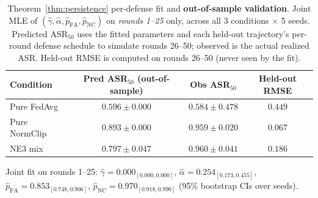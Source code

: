 \begin{table}[h]
\caption{Theorem~\ref{thm:persistence} per-defense fit and \textbf{out-of-sample validation}. Joint MLE of $(\hat\gamma, \hat\alpha, \hat p_{\mathrm{FA}}, \hat p_{\mathrm{NC}})$ on \emph{rounds 1--25} only, across all 3 conditions $\times$ 5 seeds. Predicted ASR$_{50}$ uses the fitted parameters and each held-out trajectory's per-round defense schedule to simulate rounds 26--50; observed is the actual realized ASR. Held-out RMSE is computed on rounds 26--50 (never seen by the fit).}
\label{tab:persistence_fit}
\centering\small
\begin{tabular}{lccc}
\toprule
Condition & Pred ASR$_{50}$ (out-of-sample) & Obs ASR$_{50}$ & Held-out RMSE \\
\midrule
Pure FedAvg & $0.596\pm0.000$ & $0.584\pm0.478$ & $0.449$ \\
Pure NormClip & $0.893\pm0.000$ & $0.959\pm0.020$ & $0.067$ \\
NE3 mix & $0.797\pm0.047$ & $0.960\pm0.041$ & $0.186$ \\
\bottomrule
\end{tabular}

\vspace{0.3em}
\small
Joint fit on rounds 1--25: $\hat\gamma = 0.000_{[0.000,0.000]}$, $\hat\alpha = 0.254_{[0.173,0.455]}$, $\hat p_{\mathrm{FA}} = 0.853_{[0.748,0.906]}$, $\hat p_{\mathrm{NC}} = 0.970_{[0.918,0.990]}$ (95\% bootstrap CIs over seeds).
\end{table}